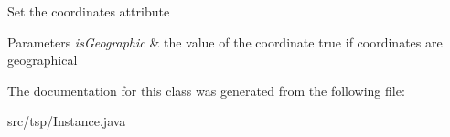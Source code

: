 Set the coordinates attribute 
\begin{DoxyParams}{Parameters}
{\em is\+Geographic} & the value of the coordinate {\ttfamily true} if coordinates are geographical \\
\hline
\end{DoxyParams}


The documentation for this class was generated from the following file\+:\begin{DoxyCompactItemize}
\item 
src/tsp/Instance.\+java\end{DoxyCompactItemize}
